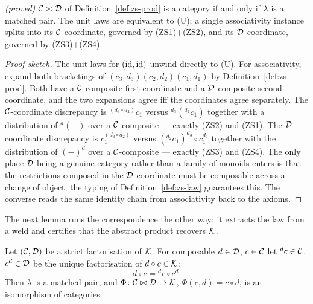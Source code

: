 \begin{theorem}\label{thm:zs-axioms}
\emph{(proved)}\;
$\mathcal{C}\bowtie\mathcal{D}$ of Definition~\ref{def:zs-prod} is a category if and only if
$\lambda$ is a matched pair. The unit laws are equivalent to \textnormal{(U)}; a
single associativity instance splits into its $\mathcal{C}$-coordinate, governed by
\textnormal{(ZS1)+(ZS2)}, and its $\mathcal{D}$-coordinate, governed by
\textnormal{(ZS3)+(ZS4)}.
\end{theorem}

\begin{proof}[Proof sketch]
The unit laws for $(\mathrm{id},\mathrm{id})$ unwind directly to (U). For associativity, expand
both bracketings of $(c_3,d_3)(c_2,d_2)(c_1,d_1)$ by Definition~\ref{def:zs-prod}.
Both have a $\mathcal{C}$-composite first coordinate and a $\mathcal{D}$-composite second coordinate,
and the two expansions agree iff the coordinates agree separately. The
$\mathcal{C}$-coordinate discrepancy is ${}^{(d_3\circ d_2)}c_1$ versus
${}^{d_3}({}^{d_2}c_1)$ together with a distribution of ${}^{d}(-)$ over a
$\mathcal{C}$-composite --- exactly (ZS2) and (ZS1). The $\mathcal{D}$-coordinate discrepancy is
$c_1^{(d_3\circ d_2)}$ versus $({}^{d_2}c_1)^{d_3}\!\circ c_1^{d_2}$ together with
the distribution of $(-)^{d}$ over a $\mathcal{C}$-composite --- exactly (ZS3) and (ZS4).
The only place $\mathcal{D}$ being a genuine category rather than a family of monoids enters
is that the restrictions composed in the $\mathcal{D}$-coordinate must be composable across
a change of object; the typing of Definition~\ref{def:zs-law} guarantees this. The
converse reads the same identity chain from associativity back to the axioms.
\end{proof}

The next lemma runs the correspondence the other way: it extracts the law from a
weld and certifies that the abstract product recovers $\mathcal{K}$.

\begin{lemma}\label{lem:zs-extract}
Let $(\mathcal{C},\mathcal{D})$ be a strict factorisation of $\mathcal{K}$. For composable $d\in\mathcal{D}$, $c\in\mathcal{C}$
let ${}^{d}c\in\mathcal{C}$, $c^{d}\in\mathcal{D}$ be the unique factorisation of $d\circ c\in\mathcal{K}$:
\[
  d\circ c={}^{d}c\circ c^{d}.
\]
Then $\lambda$ is a matched pair, and $\Phi\colon\mathcal{C}\bowtie\mathcal{D}\to\mathcal{K}$,
$\Phi(c,d)=c\circ d$, is an isomorphism of categories.
\end{lemma}

